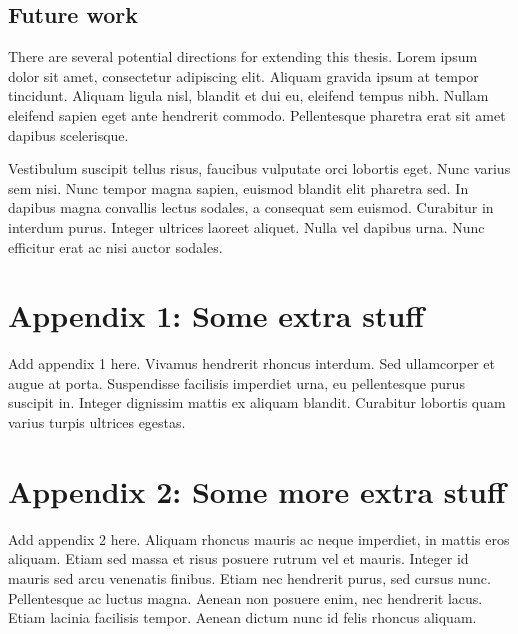\hypertarget{future-work}{%
\subsection{Future work}\label{future-work}}

There are several potential directions for extending this thesis.
Lorem ipsum dolor sit amet, consectetur adipiscing elit. Aliquam
gravida ipsum at tempor tincidunt. Aliquam ligula nisl, blandit et
dui eu, eleifend tempus nibh. Nullam eleifend sapien eget ante
hendrerit commodo. Pellentesque pharetra erat sit amet dapibus
scelerisque.

Vestibulum suscipit tellus risus, faucibus vulputate orci lobortis
eget. Nunc varius sem nisi. Nunc tempor magna sapien, euismod
blandit elit pharetra sed. In dapibus magna convallis lectus
sodales, a consequat sem euismod. Curabitur in interdum purus.
Integer ultrices laoreet aliquet. Nulla vel dapibus urna. Nunc
efficitur erat ac nisi auctor sodales.

\hypertarget{appendix-1-some-extra-stuff}{%
\section*{Appendix 1: Some extra
stuff}\label{appendix-1-some-extra-stuff}}

Add appendix 1 here. Vivamus hendrerit rhoncus interdum. Sed
ullamcorper et augue at porta. Suspendisse facilisis imperdiet urna,
eu pellentesque purus suscipit in. Integer dignissim mattis ex
aliquam blandit. Curabitur lobortis quam varius turpis ultrices
egestas.

\hypertarget{appendix-2-some-more-extra-stuff}{%
\section*{Appendix 2: Some more extra
stuff}\label{appendix-2-some-more-extra-stuff}}

Add appendix 2 here. Aliquam rhoncus mauris ac neque imperdiet, in
mattis eros aliquam. Etiam sed massa et risus posuere rutrum vel et
mauris. Integer id mauris sed arcu venenatis finibus. Etiam nec
hendrerit purus, sed cursus nunc. Pellentesque ac luctus magna.
Aenean non posuere enim, nec hendrerit lacus. Etiam lacinia
facilisis tempor. Aenean dictum nunc id felis rhoncus aliquam.